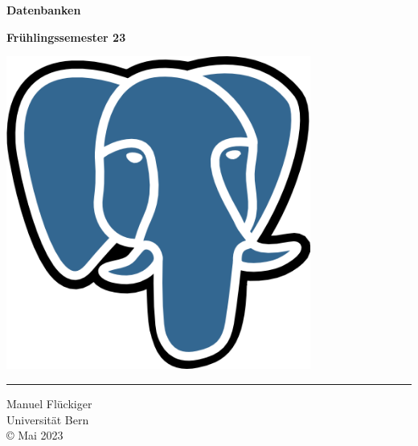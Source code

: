 \documentclass[12pt,deu]{skript_ogg}
\begin{document}
\thispagestyle{empty}
\begin{titlepage}

\begin{center}

\vspace*{0cm} {\setlength{\baselineskip}{8ex}

{\Huge\textbf{Datenbanken}\\[2.5cm]}

{\Large\textbf{Fr\"uhlingssemester 23}}}

\vspace{5mm}

\includegraphics[width=10cm]{Postgresql_elephant.png}
\end{center}

\vfill


\rule{\textwidth}{0.5pt}

\begin{flushright}
Manuel Fl\"uckiger\\
Universit\"at Bern\\
\vspace{5mm} \copyright\,\,Mai 2023
\end{flushright}

\end{titlepage}


\clearpage


\clearpage
\tableofcontents        %
\newpage

\clearpage



\clearpage

\end{document}
